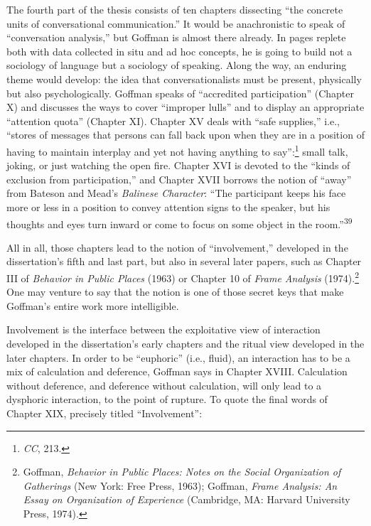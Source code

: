\documentclass[twoside,symmetric,nobib,justified]{tufte-book}
\begin{document}
The fourth part of the thesis consists of ten chapters dissecting ``the
concrete units of conversational communication.'' It would be
anachronistic to speak of ``conversation analysis,'' but Goffman is
almost there already. In pages replete both with data collected in situ
and ad hoc concepts, he is going to build not a sociology of language
but a sociology of speaking. Along the way, an enduring theme would
develop: the idea that conversationalists must be present, physically
but also psychologically. Goffman speaks of ``accredited participation''
(Chapter X) and discusses the ways to cover ``improper lulls'' and to
display an appropriate ``attention quota'' (Chapter XI). Chapter XV
deals with ``safe supplies,'' i.e., ``stores of messages that persons
can fall back upon when they are in a position of having to maintain
interplay and yet not having anything to say'':\footnote{\emph{CC}, 213.}
small talk, joking, or just watching the open fire. Chapter XVI is
devoted to the ``kinds of exclusion from participation,'' and Chapter
XVII borrows the notion of ``away'' from Bateson and Mead's
\emph{Balinese Character}: ``The participant keeps his face more or less
in a position to convey attention signs to the speaker, but his thoughts
and eyes turn inward or come to focus on some object in the
room.''\textsuperscript{39}

All in all, those chapters lead to the notion of ``involvement,''
developed in the dissertation's fifth and last part, but also in several
later papers, such as Chapter III of \emph{Behavior in Public Places}
(1963) or Chapter 10 of \emph{Frame Analysis} (1974).\footnote{Goffman,
  \emph{Behavior in Public Places: Notes on the Social Organization of
  Gatherings} (New York: Free Press, 1963); Goffman, \emph{Frame
  Analysis: An Essay on Organization of Experience} (Cambridge, MA:
  Harvard University Press, 1974).} One may venture to say that the
notion is one of those secret keys that make Goffman's entire work more
intelligible.

Involvement is the interface between the exploitative view of
interaction developed in the dissertation's early chapters and the
ritual view developed in the later chapters. In order to be ``euphoric''
(i.e., fluid), an interaction has to be a mix of calculation and
deference, Goffman says in Chapter XVIII. Calculation without deference,
and deference without calculation, will only lead to a dysphoric
interaction, to the point of rupture. To quote the final words of
Chapter XIX, precisely titled ``Involvement'':
\end{document}
